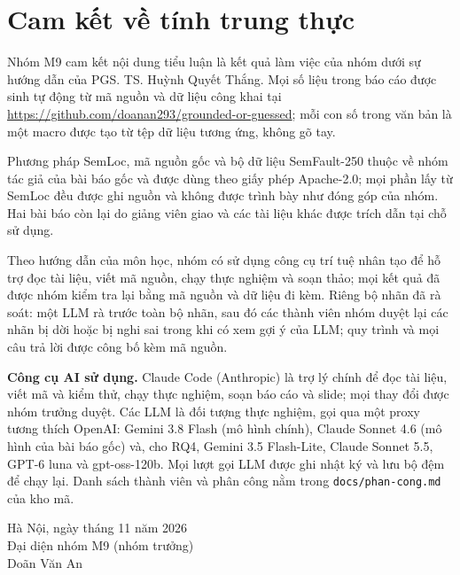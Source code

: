 \chapter*{Cam kết về tính trung thực}
{
Nhóm M9 cam kết nội dung tiểu luận là kết quả làm việc của nhóm dưới sự hướng dẫn của PGS. TS. Huỳnh Quyết Thắng.
Mọi số liệu trong báo cáo được sinh tự động từ mã nguồn và dữ liệu công khai tại
\url{https://github.com/doanan293/grounded-or-guessed}; mỗi con số trong văn bản là một macro được tạo
từ tệp dữ liệu tương ứng, không gõ tay.

Phương pháp SemLoc, mã nguồn gốc và bộ dữ liệu SemFault-250 thuộc về nhóm tác giả của bài báo gốc
\cite{yang2026semloc} và được dùng theo giấy phép Apache-2.0; mọi phần lấy từ SemLoc đều được ghi nguồn và
không được trình bày như đóng góp của nhóm. Hai bài báo còn lại do giảng viên giao
\cite{yang2026effiholmes,medeiros2026crash} và các tài liệu khác được trích dẫn tại chỗ sử dụng.

Theo hướng dẫn của môn học, nhóm có sử dụng công cụ trí tuệ nhân tạo để hỗ trợ đọc tài liệu, viết mã nguồn, chạy
thực nghiệm và soạn thảo; mọi kết quả đã được nhóm kiểm tra lại bằng mã nguồn và dữ liệu đi kèm. Riêng bộ nhãn đã rà
soát: một LLM rà trước toàn bộ nhãn, sau đó các thành viên nhóm duyệt lại các nhãn bị dời hoặc bị nghi sai trong khi có
xem gợi ý của LLM; quy trình và mọi câu trả lời được công bố kèm mã nguồn.

\textbf{Công cụ AI sử dụng.} Claude Code (Anthropic) là trợ lý chính để đọc tài liệu, viết mã và kiểm thử, chạy thực
nghiệm, soạn báo cáo và slide; mọi thay đổi được nhóm trưởng duyệt. Các LLM là đối tượng thực nghiệm, gọi qua một proxy
tương thích OpenAI: Gemini 3.8 Flash (mô hình chính), Claude Sonnet 4.6 (mô hình của bài báo gốc) và, cho RQ4, Gemini 3.5
Flash-Lite, Claude Sonnet 5.5, GPT-6 luna và gpt-oss-120b. Mọi lượt gọi LLM được ghi nhật ký và lưu bộ đệm để chạy lại.
Danh sách thành viên và phân công nằm trong \texttt{docs/phan-cong.md} của kho mã.

}
\vspace{0.6cm}
\hfill Hà Nội, ngày \quad tháng 11 năm 2026\\
\hfill Đại diện nhóm M9 (nhóm trưởng)\\[1.2cm]
\hfill Doãn Văn An

